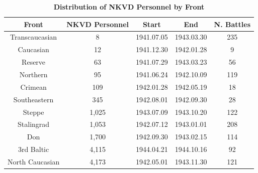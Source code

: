 \begin{table}[ht]
\centering
\caption{{\bf Distribution of NKVD Personnel by Front\\}} 
\label{tab:nkvd_front}
\begingroup\small
\begin{tabular}{p{2.5cm}p{3.5cm}p{1.75cm}p{1.75cm}p{1.75cm}}
  \toprule \multicolumn{1}{c}{Front} & \multicolumn{1}{c}{NKVD Personnel} & \multicolumn{1}{c}{Start} & \multicolumn{1}{c}{End} & \multicolumn{1}{c}{N. Battles} \\ 
  \midrule \multicolumn{1}{c}{Transcaucasian} & \multicolumn{1}{c}{     8} & \multicolumn{1}{c}{1941.07.05} & \multicolumn{1}{c}{1943.03.30} & \multicolumn{1}{c}{235} \\ 
  \multicolumn{1}{c}{Caucasian} & \multicolumn{1}{c}{    12} & \multicolumn{1}{c}{1941.12.30} & \multicolumn{1}{c}{1942.01.28} & \multicolumn{1}{c}{9} \\ 
  \multicolumn{1}{c}{Reserve} & \multicolumn{1}{c}{    63} & \multicolumn{1}{c}{1941.07.29} & \multicolumn{1}{c}{1943.03.23} & \multicolumn{1}{c}{56} \\ 
  \multicolumn{1}{c}{Northern} & \multicolumn{1}{c}{    95} & \multicolumn{1}{c}{1941.06.24} & \multicolumn{1}{c}{1942.10.09} & \multicolumn{1}{c}{119} \\ 
  \multicolumn{1}{c}{Crimean} & \multicolumn{1}{c}{   109} & \multicolumn{1}{c}{1942.01.28} & \multicolumn{1}{c}{1942.05.19} & \multicolumn{1}{c}{18} \\ 
  \multicolumn{1}{c}{Southeastern} & \multicolumn{1}{c}{   345} & \multicolumn{1}{c}{1942.08.01} & \multicolumn{1}{c}{1942.09.30} & \multicolumn{1}{c}{28} \\ 
  \multicolumn{1}{c}{Steppe} & \multicolumn{1}{c}{ 1,025} & \multicolumn{1}{c}{1943.07.09} & \multicolumn{1}{c}{1943.10.20} & \multicolumn{1}{c}{122} \\ 
  \multicolumn{1}{c}{Stalingrad} & \multicolumn{1}{c}{ 1,053} & \multicolumn{1}{c}{1942.07.12} & \multicolumn{1}{c}{1943.01.01} & \multicolumn{1}{c}{208} \\ 
  \multicolumn{1}{c}{Don} & \multicolumn{1}{c}{ 1,700} & \multicolumn{1}{c}{1942.09.30} & \multicolumn{1}{c}{1943.02.15} & \multicolumn{1}{c}{114} \\ 
  \multicolumn{1}{c}{3rd Baltic} & \multicolumn{1}{c}{ 4,115} & \multicolumn{1}{c}{1944.04.21} & \multicolumn{1}{c}{1944.10.16} & \multicolumn{1}{c}{92} \\ 
  \multicolumn{1}{c}{North Caucasian} & \multicolumn{1}{c}{ 4,173} & \multicolumn{1}{c}{1942.05.01} & \multicolumn{1}{c}{1943.11.30} & \multicolumn{1}{c}{121} \\ 

\end{tabular}
\end{table}
